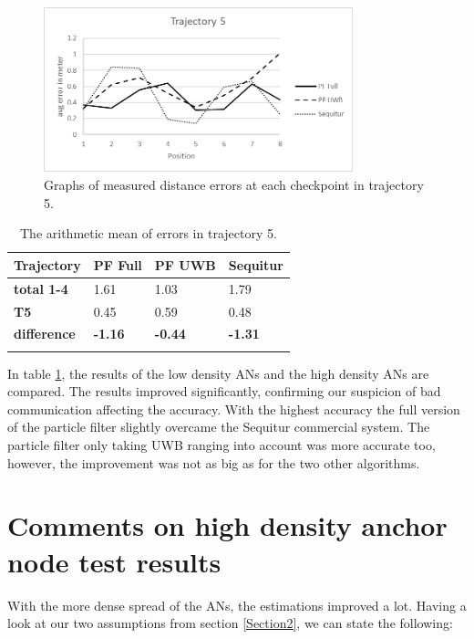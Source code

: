\begin{figure}[th]
\centering
\includegraphics[width=0.8\textwidth]{Figures/trajectory5_results}
\decoRule
\caption[Positioning results trajectory 5]{Graphs of measured distance errors at each checkpoint in trajectory 5.}
\label{fig:trajectory5_results}
\end{figure}

\begin{table}
\caption{The arithmetic mean of errors in trajectory 5.}
\label{tab:arithmetic_errors_trajectory5}
\centering
\begin{tabular}{l l l l}
\toprule
\textbf{Trajectory} & \textbf{PF Full} & \textbf{PF UWB} & \textbf{Sequitur}\\
\midrule
\textbf{total 1-4} & 1.61 & 1.03 & 1.79\\
\textbf{T5} & 0.45 & 0.59 & 0.48\\
\midrule
\textbf{difference}  & \textbf{-1.16} & \textbf{-0.44} & \textbf{-1.31}\\
\bottomrule\\
\end{tabular}
\end{table}

In table \ref{tab:arithmetic_errors_trajectory5}, the results of the low density ANs and the high density ANs are compared. The results improved significantly, confirming our suspicion of bad communication affecting the accuracy. With the highest accuracy the full version of the particle filter slightly overcame the Sequitur commercial system. The particle filter only taking UWB ranging into account was more accurate too, however, the improvement was not as big as for the two other algorithms.


\section{Comments on high density anchor node test results}
\label{Section4}
With the more dense spread of the ANs, the estimations improved a lot. Having a look at our two assumptions from section \ref{Section2}, we can state the following:

